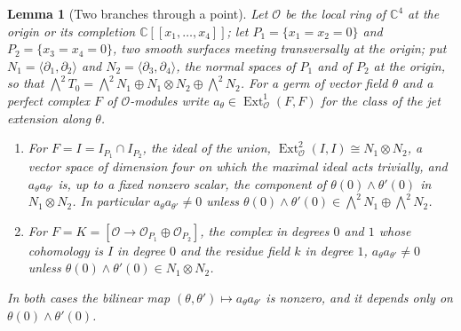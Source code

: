 \documentclass[11pt,reqno]{amsart}
\theoremstyle{plain}
\newtheorem{lemma}[theorem]{Lemma}
\theoremstyle{definition}
\theoremstyle{remark}
\newcommand{\CC}{\mathbb{C}}
\newcommand{\cO}{\mathcal{O}}
\DeclareMathOperator{\Ext}{Ext}
\begin{document}
\begin{lemma}[Two branches through a point]\label{lem:localproducts}
Let $\cO$ be the local ring of $\CC^{4}$ at the origin or its completion
$\CC[[x_{1},\dots,x_{4}]]$; let $P_{1}=\{x_{1}=x_{2}=0\}$ and
$P_{2}=\{x_{3}=x_{4}=0\}$, two smooth surfaces meeting transversally at the
origin; put $N_{1}=\langle\partial_{1},\partial_{2}\rangle$ and
$N_{2}=\langle\partial_{3},\partial_{4}\rangle$, the normal spaces of $P_{1}$
and of $P_{2}$ at the origin, so that
$\bigwedge^{2}T_{0}=\bigwedge^{2}N_{1}\oplus N_{1}\otimes N_{2}\oplus\bigwedge^{2}N_{2}$.
For a germ of vector field $\theta$ and a perfect complex $F$ of
$\cO$-modules write $a_{\theta}\in\Ext^{1}_{\cO}(F,F)$ for the class of the
jet extension along $\theta$.
\begin{enumerate}[label=\textup{(\roman*)},nosep]
\item For $F=I=I_{P_{1}}\cap I_{P_{2}}$, the ideal of the union,
  $\Ext^{2}_{\cO}(I,I)\cong N_{1}\otimes N_{2}$, a vector space of dimension
  four on which the maximal ideal acts trivially, and
  $a_{\theta}a_{\theta'}$ is, up to a fixed nonzero scalar, the component of
  $\theta(0)\wedge\theta'(0)$ in $N_{1}\otimes N_{2}$. In particular
  $a_{\theta}a_{\theta'}\ne0$ unless $\theta(0)\wedge\theta'(0)\in
  \bigwedge^{2}N_{1}\oplus\bigwedge^{2}N_{2}$.
\item For $F=K=[\cO\to\cO_{P_{1}}\oplus\cO_{P_{2}}]$, the complex in degrees
  $0$ and $1$ whose cohomology is $I$ in degree $0$ and the residue field $k$
  in degree $1$, $a_{\theta}a_{\theta'}\ne0$ unless
  $\theta(0)\wedge\theta'(0)\in N_{1}\otimes N_{2}$.
\end{enumerate}
In both cases the bilinear map $(\theta,\theta')\mapsto a_{\theta}a_{\theta'}$
is nonzero, and it depends only on $\theta(0)\wedge\theta'(0)$.
\end{lemma}
\end{document}
